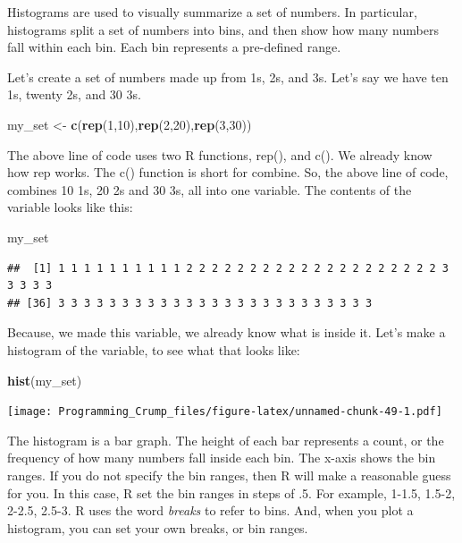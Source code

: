 \documentclass[]{book}
\newenvironment{Shaded}{\begin{snugshade}}{\end{snugshade}}
\newcommand{\KeywordTok}[1]{\textcolor[rgb]{0.13,0.29,0.53}{\textbf{{#1}}}}
\newcommand{\DecValTok}[1]{\textcolor[rgb]{0.00,0.00,0.81}{{#1}}}
\newcommand{\StringTok}[1]{\textcolor[rgb]{0.31,0.60,0.02}{{#1}}}
\newcommand{\NormalTok}[1]{{#1}}
\theoremstyle{definition}
\theoremstyle{definition}
\theoremstyle{definition}
\theoremstyle{remark}
\begin{document}
Histograms are used to visually summarize a set of numbers. In
particular, histograms split a set of numbers into bins, and then show
how many numbers fall within each bin. Each bin represents a pre-defined
range.

Let's create a set of numbers made up from 1s, 2s, and 3s. Let's say we
have ten 1s, twenty 2s, and 30 3s.

\begin{Shaded}
\begin{Highlighting}[]
\NormalTok{my_set <-}\StringTok{ }\KeywordTok{c}\NormalTok{(}\KeywordTok{rep}\NormalTok{(}\DecValTok{1}\NormalTok{,}\DecValTok{10}\NormalTok{),}\KeywordTok{rep}\NormalTok{(}\DecValTok{2}\NormalTok{,}\DecValTok{20}\NormalTok{),}\KeywordTok{rep}\NormalTok{(}\DecValTok{3}\NormalTok{,}\DecValTok{30}\NormalTok{))}
\end{Highlighting}
\end{Shaded}

The above line of code uses two R functions, rep(), and c(). We already
know how rep works. The c() function is short for combine. So, the above
line of code, combines 10 1s, 20 2s and 30 3s, all into one variable.
The contents of the variable looks like this:

\begin{Shaded}
\begin{Highlighting}[]
\NormalTok{my_set}
\end{Highlighting}
\end{Shaded}

\begin{verbatim}
##  [1] 1 1 1 1 1 1 1 1 1 1 2 2 2 2 2 2 2 2 2 2 2 2 2 2 2 2 2 2 2 2 3 3 3 3 3
## [36] 3 3 3 3 3 3 3 3 3 3 3 3 3 3 3 3 3 3 3 3 3 3 3 3 3
\end{verbatim}

Because, we made this variable, we already know what is inside it. Let's
make a histogram of the variable, to see what that looks like:

\begin{Shaded}
\begin{Highlighting}[]
\KeywordTok{hist}\NormalTok{(my_set)}
\end{Highlighting}
\end{Shaded}

\texttt{[image: Programming\_Crump\_files/figure-latex/unnamed-chunk-49-1.pdf]}

The histogram is a bar graph. The height of each bar represents a count,
or the frequency of how many numbers fall inside each bin. The x-axis
shows the bin ranges. If you do not specify the bin ranges, then R will
make a reasonable guess for you. In this case, R set the bin ranges in
steps of .5. For example, 1-1.5, 1.5-2, 2-2.5, 2.5-3. R uses the word
\emph{breaks} to refer to bins. And, when you plot a histogram, you can
set your own breaks, or bin ranges.
\end{document}
